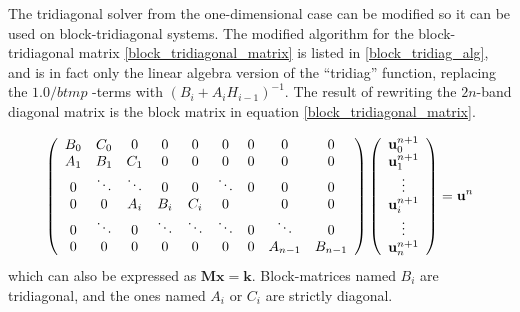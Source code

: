 
The tridiagonal solver from the one-dimensional case can be modified so it can be used on block-tridiagonal systems. 
The modified algorithm for the block-tridiagonal matrix \eqref{block_tridiagonal_matrix} is listed in \eqref{block_tridiag_alg}, and is in fact only the linear algebra version of the ``tridiag'' function, replacing the $1.0/btmp$ -terms with $\left(B_i+A_iH_{i-1}\right)^{-1}$. The result of rewriting the $2n$-band diagonal matrix is the block matrix in equation \eqref{block_tridiagonal_matrix}.

\begin{align}\label{block_tridiagonal_matrix}
   \left(\begin{array}{c c c c c c c c c}
        B_0 & C_0 &0 &0 &0 &0 &0 &0 &0\\
        A_1 & B_1 & C_1 &0 &0 &0 &0 &0 &0\\
        0&\ddots & \ddots & 0 & 0 & \ddots &0&0&0\\
        0 & 0&A_i & B_i & C_i& 0 &  &0&0\\
        0& \ddots&0&\ddots & \ddots & \ddots & 0 & \ddots &0\\
         0&0 &0 &0&0 &0&0&A_{n-1} & B_{n-1}
       \end{array}\right) \left(\begin{array}{c}
             \mathbf{u}^{n+1}_{0}\\
             \mathbf{u}^{n+1}_{1}\\
             \vdots\\
             \mathbf{u}^{n+1}_{i}\\
             \vdots\\
             \mathbf{u}^{n+1}_{n}
             \end{array}\right) = \mathbf{u}^{n}
\end{align}
which can also be expressed as $\mathbf M\mathbf{x} = \mathbf{k}$. Block-matrices named $B_i$ are tridiagonal, and the ones named $A_i$ or $C_i$ are strictly diagonal. 


